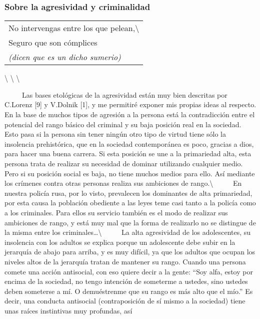 \protect\hypertarget{M24}{}{}

\subsubsection{Sobre la agresividad y
criminalidad}\label{sobre-la-agresividad-y-criminalidad}

\begin{longtable}[]{@{}l@{}}
\toprule
No intervengas entre los que pelean,\textbackslash{}\tabularnewline
Seguro que son cómplices\tabularnewline
\emph{(dicen que es un dicho sumerio)}\tabularnewline
\bottomrule
\end{longtable}

\textbackslash{} \textbackslash{} \textbackslash{}

~ ~ ~ Las bases etológicas de la agresividad están muy bien descritas
por C.Lorenz {[}9{]} y V.Dolnik {[}1{]}, y me permitiré exponer mis
propias ideas al respecto. En la base de muchos tipos de agresión a la
persona está la contradicción entre el potencial del rango básico del
criminal y su baja posición real en la sociedad. Esto pasa si la persona
sin tener ningún otro tipo de virtud tiene sólo la insolencia
prehistórica, que en la sociedad contemporánea es poco, gracias a dios,
para hacer una buena carrera. Si esta posición se une a la primariedad
alta, esta persona trata de realizar su necesidad de dominar utilizando
cualquier medio. Pero si su posición social es baja, no tiene muchos
medios para ello. Así mediante los crímenes contra otras personas
realiza sus ambiciones de rango.\textbackslash{} ~ ~ ~ En nuestra
policía rusa, por lo visto, prevalecen los dominantes de alta
primariedad, por esta causa la población obediente a las leyes teme casi
tanto a la policía como a los criminales. Para ellos su servicio también
es el modo de realizar sus ambiciones de rango, y está muy mal que la
forma de realizarlo no se distingue de la misma entre los
criminales\ldots{}\textbackslash{} ~ ~ ~ La alta agresividad de los
adolescentes, su insolencia con los adultos se explica porque un
adolescente debe subir en la jerarquía de abajo para arriba, y es muy
difícil, ya que los adultos que ocupan los niveles altos de la jerarquía
tratan de mantener su rango. Cuando una persona comete una acción
antisocial, con eso quiere decir a la gente: ``Soy alfa, estoy por
encima de la sociedad, no tengo intención de someterme a ustedes, sino
ustedes deben someterse a mí. O demuéstrenme que su rango es más alto
que el mío.'' Es decir, una conducta antisocial (contraposición de sí
mismo a la sociedad) tiene unas raíces instintivas muy profundas, así
